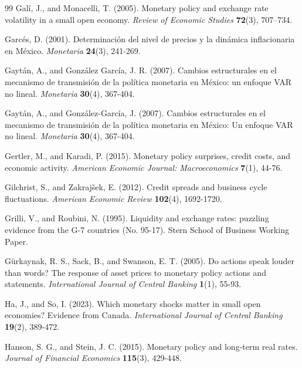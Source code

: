 \documentclass[12pt, reqno]{article}
\begin{document}
\begin{thebibliography}{99}
\bibitem{} \hypertarget{Gali and Monacelli (2005)}{} Galí, J., and Monacelli, T. (2005). Monetary policy and exchange rate volatility in a small open economy. \textit{Review of Economic Studies} \textbf{72}(3), 707–734.

\bibitem{} \hypertarget{Garcés (2001)}{}Garcés, D. (2001). Determinación del nivel de precios y la dinámica inflacionaria en México. \textit{Monetaria} \textbf{24}(3), 241-269.

\bibitem{} \hypertarget{Garcia (2007)}{}Gaytán, A., and González García, J. R. (2007). Cambios estructurales en el mecanismo de transmisión de la política monetaria en México: un enfoque VAR no lineal. \textit{Monetaria} \textbf{30}(4), 367-404.

\bibitem{} \hypertarget{Gaytan and Gonzalez-Garcia (2007)}{}
Gaytán, A., and González-García, J. (2007). Cambios estructurales en el mecanismo de transmisión de la política monetaria en México: Un enfoque VAR no lineal. \textit{Monetaria} \textbf{30}(4), 367-404.

\bibitem{} \hypertarget{Gertler and Karadi (2015)}{}Gertler, M., and Karadi, P. (2015). Monetary policy surprises, credit costs, and economic activity. \textit{American Economic Journal: Macroeconomics} \textbf{7}(1), 44-76.

\bibitem{} \hypertarget{Gilchrist (2012)}{}Gilchrist, S., and Zakrajšek, E. (2012). Credit spreads and business cycle fluctuations. \textit{American Economic Review} \textbf{102}(4), 1692-1720.

\bibitem{} \hypertarget{Grilli and Roubini (1995)}{} Grilli, V., and Roubini, N. (1995). Liquidity and exchange rates: puzzling evidence from the G-7 countries (No. 95-17). Stern School of Business Working Paper.

\bibitem{} \hypertarget{Gurkaynak et al. (2005)}{} Gürkaynak, R. S., Sack, B., and Swanson, E. T. (2005). Do actions speak louder than words? The response of asset prices to monetary policy actions and statements. \textit{International Journal of Central Banking} \textbf{1}(1), 55-93.

\bibitem{} \hypertarget{Ha and So (2023)}{}Ha, J., and So, I. (2023). Which monetary shocks matter in small open economies? Evidence from Canada. \textit{International Journal of Central Banking} \textbf{19}(2), 389-472.

\bibitem{} \hypertarget{Hanson and Stein (2015)}{}
Hanson, S. G., and Stein, J. C. (2015). Monetary policy and long-term real rates. \textit{Journal of Financial Economics} \textbf{115}(3), 429-448.


\end{thebibliography}
\end{document}
